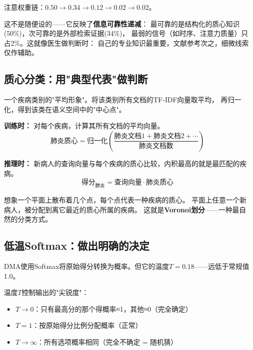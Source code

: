 \documentclass[11pt,a4paper]{ctexart}
\begin{document}
\begin{keybox}[权重的递减规律]
注意权重链：$0.50 \to 0.34 \to 0.12 \to 0.02 \to 0.02$。

这不是随便设的——它反映了\textbf{信息可靠性递减}：
最可靠的是结构化的质心知识(50\%)，次可靠的是外部检索证据(34\%)，
最弱的信号（如时序、注意力质量）只占2\%。这就像医生做判断时：
自己的专业知识最重要，文献参考次之，细微线索仅作辅助。
\end{keybox}

\subsection{质心分类：用"典型代表"做判断}

\begin{defbox}[质心 (Centroid)]
一个疾病类别的"平均形象"。将该类别所有文档的TF-IDF向量取平均，
再归一化，得到该类在语义空间中的"中心点"。
\end{defbox}

\textbf{训练时：} 对每个疾病，计算其所有文档的平均向量。
$$\text{肺炎质心} = \text{归一化}\left(\frac{\text{肺炎文档1} + \text{肺炎文档2} + \cdots}{\text{肺炎文档数}}\right)$$

\textbf{推理时：} 新病人的查询向量与每个疾病的质心比较，内积最高的就是最匹配的疾病。
$$\text{得分}_{\text{肺炎}} = \text{查询向量} \cdot \text{肺炎质心}$$

\begin{exambox}
想象一个平面上散布着几个点，每个点代表一种疾病的质心。
平面上任意一个新病人，被分配到离它最近的质心所属的疾病。
这就是\textbf{Voronoi划分}——一种最自然的分类方式。
\end{exambox}

\subsection{低温Softmax：做出明确的决定}

DMA使用Softmax将原始得分转换为概率。但它的温度$T=0.18$——远低于常规值1.0。

\begin{defbox}[低温Softmax]
温度$T$控制输出的"尖锐度"：
\begin{itemize}[nosep]
\item $T \to 0$：只有最高分的那个得概率≈1，其他≈0（完全确定）
\item $T=1$：按原始得分比例分配概率（正常）
\item $T \to \infty$：所有选项概率相同（完全不确定 = 随机猜）
\end{itemize}
\end{defbox}
\end{document}
